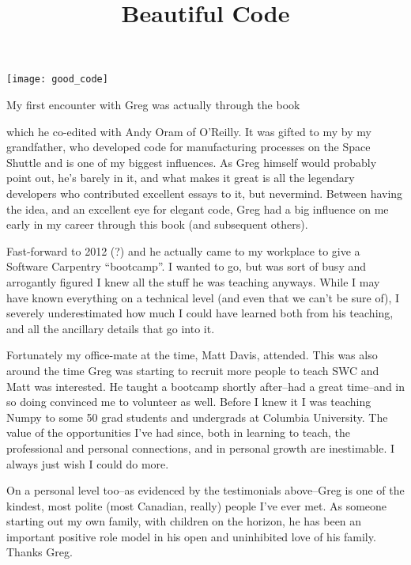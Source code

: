 
\newpage
\vspace*{\fill}
\begin{minipage}{0.45\textwidth}
    \texttt{[image: good\_code]}
\end{minipage}
\hfill
\begin{minipage}{0.45\textwidth}
\setlength{\parindent}{0in}
\setlength{\parskip}{1em}
My first encounter with Greg was actually through the book \title{Beautiful
Code} which he co-edited with Andy Oram of O'Reilly.  It was gifted to my
by my grandfather, who developed code for manufacturing processes on the
Space Shuttle and is one of my biggest influences.  As Greg himself would
probably point out, he's barely in it, and what makes it great is all the
legendary developers who contributed excellent essays to it, but nevermind.
Between having the idea, and an excellent eye for elegant code, Greg had a
big influence on me early in my career through this book (and subsequent
others).

Fast-forward to 2012 (?) and he actually came to my workplace to give a
Software Carpentry ``bootcamp''. I wanted to go, but was sort of busy and
arrogantly figured I knew all the stuff he was teaching anyways.  While I
may have known everything on a technical level (and even that we can't be
sure of), I severely underestimated how much I could have learned both from
his teaching, and all the ancillary details that go into it.

Fortunately my office-mate at the time, Matt Davis, attended.  This was
also around the time Greg was starting to recruit more people to teach SWC
and Matt was interested.  He taught a bootcamp shortly after--had a great
time--and in so doing convinced me to volunteer as well.  Before I knew it
I was teaching Numpy to some 50 grad students and undergrads at Columbia
University.  The value of the opportunities I've had since, both in
learning to teach, the professional and personal connections, and in
personal growth are inestimable.  I always just wish I could do more.

On a personal level too--as evidenced by the testimonials above--Greg is
one of the kindest, most polite (most Canadian, really) people I've ever
met.  As someone starting out my own family, with children on the horizon,
he has been an important positive role model in his open and uninhibited
love of his family.  Thanks Greg.

 \\
\end{minipage}
\vspace*{\fill}

